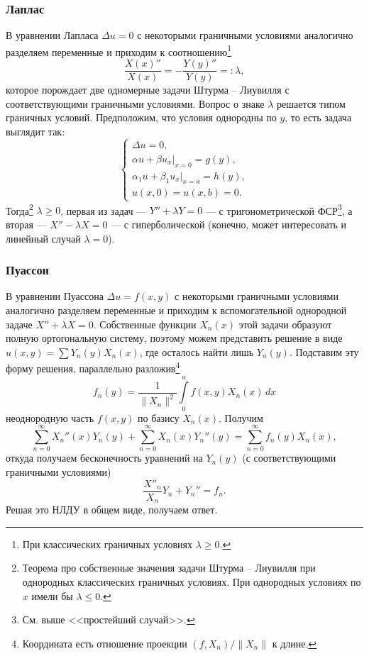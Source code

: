 \subsubsection{Лаплас}
В уравнении Лапласа $ \Delta u = 0 $ с некоторыми граничными условиями
аналогично разделяем переменные и приходим к соотношению\footnote{При
классических граничных условиях $ \lambda \geqslant 0 $.}
\[
  \frac{X(x)''}{X(x)} = - \frac{Y(y)''}{Y(y)} =: \lambda,  
\]
которое порождает две одномерные задачи Штурма -- Лиувилля с соответствующими
граничными условиями. Вопрос о знаке $ \lambda $ решается типом
граничных условий. Предположим, что условия однородны по $ y $, то есть задача
выглядит так: 
\[
  \begin{cases}
    \Delta u = 0,\\
    \alpha u + \beta u_x \Big|_{x=0}= g(y),\\
    \alpha_1 u + \beta_1 u_x \Big|_{x=a} = h(y),\\
    u(x, 0) = u(x, b) = 0.
  \end{cases}
\]
Тогда\footnote{Теорема про собственные значения задачи Штурма -- Лиувилля при
однородных классических граничных условиях. При однородных условиях по $ x $
имели бы $ \lambda \leqslant 0 $.} $
\lambda \geqslant 0 $, первая из задач --- $ Y'' + \lambda Y = 0 $ --- с
тригонометрической ФСР\footnote{См. выше <<простейший
случай>>.}, а вторая --- $ X'' - \lambda X = 0 $ --- с гиперболической
(конечно, может интересовать и линейный случай $ \lambda = 0 $).

\subsubsection{Пуассон}
В уравнении Пуассона $ \Delta u = f(x, y) $ с некоторыми граничными условиями
аналогично разделяем переменные и приходим к вспомогательной однородной задаче
$ X'' + \lambda X = 0 $. Собственные функции $ X_n(x) $ этой задачи образуют
полную ортогональную систему, поэтому можем представить решение в виде $ u(x,
y)= \sum Y_n(y) X_n(x) $, где осталось найти лишь $ Y_n(y) $. Подставим эту
форму решения, параллельно разложив\footnote{Координата есть отношение проекции
$ (f, X_n)/\|X_n\| $ к длине.}
\begin{equation}
  \label{eq:razl}
  f_n(y) = \frac{1}{\|X_n\|^2} \int\limits_{0}^{a}
  f(x, y) X_n(x)\,dx
\end{equation}
неоднородную часть $ f(x, y) $ по базису $ X_n(x) $. Получим  
\[
  \sum_{n=0}^\infty X_n''(x)Y_n(y) + \sum_{n=0}^\infty X_n(x)Y_n''(y) =
  \sum_{n=0}^\infty f_n(y)X_n(x),
\]
откуда получаем бесконечность уравнений на $ Y_n(y) $ (с соответствующими граничными условиями)
\[
  \frac{X''_n}{X_n} Y_n + Y_n'' = f_n.
\]
Решая это НЛДУ в общем виде, получаем ответ.


